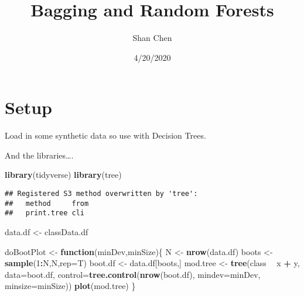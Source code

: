 \documentclass[]{article}
\title{Bagging and Random Forests}
\author{Shan Chen}
\date{4/20/2020}
\newenvironment{Shaded}{\begin{snugshade}}{\end{snugshade}}
\newcommand{\ControlFlowTok}[1]{\textcolor[rgb]{0.13,0.29,0.53}{\textbf{#1}}}
\newcommand{\DataTypeTok}[1]{\textcolor[rgb]{0.13,0.29,0.53}{#1}}
\newcommand{\DecValTok}[1]{\textcolor[rgb]{0.00,0.00,0.81}{#1}}
\newcommand{\KeywordTok}[1]{\textcolor[rgb]{0.13,0.29,0.53}{\textbf{#1}}}
\newcommand{\NormalTok}[1]{#1}
\newcommand{\OperatorTok}[1]{\textcolor[rgb]{0.81,0.36,0.00}{\textbf{#1}}}
\newcommand{\StringTok}[1]{\textcolor[rgb]{0.31,0.60,0.02}{#1}}
\begin{document}
\maketitle

\hypertarget{setup}{%
\section{Setup}\label{setup}}

Load in some synthetic data so use with Decision Trees.

\begin{Shaded}
\end{Shaded}

And the libraries\ldots{}.

\begin{Shaded}
\begin{Highlighting}[]
\KeywordTok{library}\NormalTok{(tidyverse)}
\KeywordTok{library}\NormalTok{(tree)}
\end{Highlighting}
\end{Shaded}

\begin{verbatim}
## Registered S3 method overwritten by 'tree':
##   method     from
##   print.tree cli
\end{verbatim}

\begin{Shaded}
\begin{Highlighting}[]
\NormalTok{data.df <-}\StringTok{ }\NormalTok{classData.df }

\NormalTok{doBootPlot <-}\StringTok{ }\ControlFlowTok{function}\NormalTok{(minDev,minSize)\{}
\NormalTok{  N <-}\StringTok{ }\KeywordTok{nrow}\NormalTok{(data.df)}
\NormalTok{  boots <-}\StringTok{ }\KeywordTok{sample}\NormalTok{(}\DecValTok{1}\OperatorTok{:}\NormalTok{N,N,}\DataTypeTok{rep=}\NormalTok{T)}
\NormalTok{  boot.df <-}\StringTok{ }\NormalTok{data.df[boots,]}
\NormalTok{  mod.tree <-}\StringTok{ }\KeywordTok{tree}\NormalTok{(class }\OperatorTok{~}\StringTok{ }\NormalTok{x }\OperatorTok{+}\StringTok{ }\NormalTok{y, }
                   \DataTypeTok{data=}\NormalTok{boot.df,}
                   \DataTypeTok{control=}\KeywordTok{tree.control}\NormalTok{(}\KeywordTok{nrow}\NormalTok{(boot.df),}
                                        \DataTypeTok{mindev=}\NormalTok{minDev,}
                                        \DataTypeTok{minsize=}\NormalTok{minSize))  }
  \KeywordTok{plot}\NormalTok{(mod.tree)}
\NormalTok{\}}
\end{Highlighting}
\end{Shaded}
\end{document}
